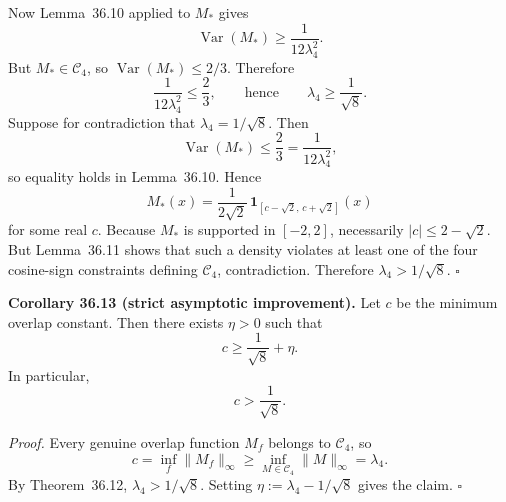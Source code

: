 Now Lemma~36.10 applied to \(M_*\) gives
\[
 \operatorname{Var}(M_*)\ge \frac{1}{12\lambda_4^2}.
\]
But \(M_*\in\mathcal C_4\), so \(\operatorname{Var}(M_*)\le 2/3\).
Therefore
\[
 \frac{1}{12\lambda_4^2}\le \frac23,
\qquad\text{hence}\qquad
 \lambda_4\ge \frac{1}{\sqrt 8}.
\]
Suppose for contradiction that \(\lambda_4=1/\sqrt 8\).
Then
\[
 \operatorname{Var}(M_*)\le \frac23 = \frac{1}{12\lambda_4^2},
\]
so equality holds in Lemma~36.10.
Hence
\[
 M_*(x)=\frac{1}{2\sqrt 2}\,\mathbf 1_{[c-\sqrt 2,\,c+\sqrt 2]}(x)
\]
for some real \(c\).
Because \(M_*\) is supported in \([-2,2]\), necessarily \(|c|\le 2-\sqrt 2\).
But Lemma~36.11 shows that such a density violates at least one of the four cosine-sign constraints defining \(\mathcal C_4\), contradiction.
Therefore \(\lambda_4>1/\sqrt 8\).
\hfill$\square$

\medskip
\noindent\textbf{Corollary 36.13 (strict asymptotic improvement).}
Let \(c\) be the minimum overlap constant.
Then there exists \(\eta>0\) such that
\[
 c\ge \frac{1}{\sqrt 8}+\eta.
\]
In particular,
\[
 c>\frac{1}{\sqrt 8}.
\]

\noindent\emph{Proof.}
Every genuine overlap function \(M_f\) belongs to \(\mathcal C_4\), so
\[
 c=\inf_f \|M_f\|_\infty\ge \inf_{M\in\mathcal C_4}\|M\|_\infty=\lambda_4.
\]
By Theorem~36.12, \(\lambda_4>1/\sqrt 8\).
Setting \(\eta:=\lambda_4-1/\sqrt 8\) gives the claim.
\hfill$\square$

